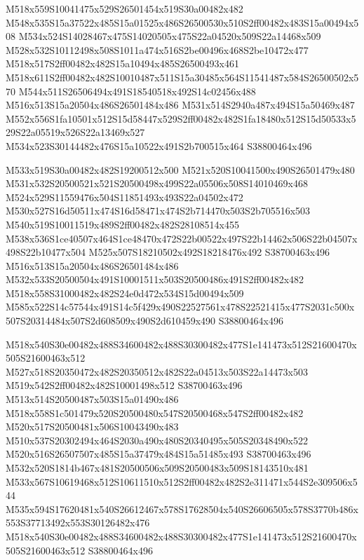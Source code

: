 \documentclass{article}
\begin{document}
\begin{multicols}{2}
M518x559S10041475x529S26501454x519S30a00482x482 M548x535S15a37522x485S15a01525x486S26500530x510S2ff00482x483S15a00494x508 M534x524S14028467x475S14020505x475S22a04520x509S22a14468x509 M528x532S10112498x508S1011a474x516S2be00496x468S2be10472x477 M518x517S2ff00482x482S15a10494x485S26500493x461 M518x611S2ff00482x482S10010487x511S15a30485x564S11541487x584S26500502x570 M544x511S26506494x491S18540518x492S14c02456x488 M516x513S15a20504x486S26501484x486 M531x514S2940a487x494S15a50469x487 M552x556S1fa10501x512S15d58447x529S2ff00482x482S1fa18480x512S15d50533x529S22a05519x526S22a13469x527 M534x523S30144482x476S15a10522x491S2b700515x464 S38800464x496

M533x519S30a00482x482S19200512x500 M521x520S10041500x490S26501479x480 M531x532S20500521x521S20500498x499S22a05506x508S14010469x468 M524x529S11559476x504S11851493x493S22a04502x472 M530x527S16d50511x474S16d58471x474S2b714470x503S2b705516x503 M540x519S10011519x489S2ff00482x482S28108514x455 M538x536S1ce40507x464S1ce48470x472S22b00522x497S22b14462x506S22b04507x498S22b10477x504 M525x507S18210502x492S18218476x492 S38700463x496 M516x513S15a20504x486S26501484x486 M532x533S20500504x491S10001511x503S20500486x491S2ff00482x482 M518x558S31000482x482S24e0d472x534S15d00494x509 M585x522S14c57544x491S14c5f429x490S22527561x478S22521415x477S2031c500x507S20314484x507S2d608509x490S2d610459x490 S38800464x496

M518x540S30e00482x488S34600482x488S30300482x477S1e141473x512S21600470x505S21600463x512 M527x518S20350472x482S20350512x482S22a04513x503S22a14473x503 M519x542S2ff00482x482S10001498x512 S38700463x496 M513x514S20500487x503S15a01490x486 M518x558S1c501479x520S20500480x547S20500468x547S2ff00482x482 M520x517S20500481x506S10043490x483 M510x537S20302494x464S2030a490x480S20340495x505S20348490x522 M520x516S26507507x485S15a37479x484S15a51485x493 S38700463x496 M532x520S1814b467x481S20500506x509S20500483x509S18143510x481 M533x567S10619468x512S10611510x512S2ff00482x482S2e311471x544S2e309506x544 M535x594S17620481x540S26612467x578S17628504x540S26606505x578S3770b486x553S37713492x553S30126482x476 M518x540S30e00482x488S34600482x488S30300482x477S1e141473x512S21600470x505S21600463x512 S38800464x496


\end{multicols}
\end{document}
